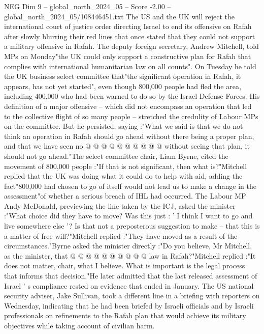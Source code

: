 \begin{textsample}{NEG Dim 9 – global\_north\_2024\_05 – Score -2.00 – global\_north\_2024\_05/108446451.txt}  \label{ex:f9_neg_159}
The US and the UK will reject the international court of justice order directing Israel to end its offensive on Rafah after slowly blurring their red lines that once stated that they could not support a military offensive in Rafah.
The deputy foreign secretary, Andrew Mitchell, told MPs on Monday"the UK could only support a constructive plan for Rafah that complies with international humanitarian law on all counts".
On Tuesday he told the UK business select committee that"the significant operation in Rafah, it appears, has not yet started", even though 800,000 people had fled the area, including 400,000 who had been warned to do so by the Israel Defense Forces.
His definition of a major offensive -- which did not encompass an operation that led to the collective flight of so many people -- stretched the credulity of Labour MPs on the committee.
But he persisted, saying :"What we said is that we do not think an operation in Rafah should go ahead without there being a proper plan, and that we have seen no @ @ @ @ @ @ @ @ @ @ without seeing that plan, it should not go ahead."The select committee chair, Liam Byrne, cited the movement of 800,000 people :"If that is not significant, then what is?"Mitchell replied that the UK was doing what it could do to help with aid, adding the fact"800,000 had chosen to go of itself would not lead us to make a change in the assessment"of whether a serious breach of IHL had occurred.
The Labour MP Andy McDonald, previewing the line taken by the ICJ, asked the minister :"What choice did they have to move?
Was this just : ' I think I want to go and live somewhere else '?
Is that not a preposterous suggestion to make -- that this is a matter of free will?"Mitchell replied :"They have moved as a result of the circumstances."Byrne asked the minister directly :"Do you believe, Mr Mitchell, as the minister, that @ @ @ @ @ @ @ @ @ @ law in Rafah?"Mitchell replied :"It does not matter, chair, what I believe.
What is important is the legal process that informs that decision."He later admitted that the last released assessment of Israel ' s compliance rested on evidence that ended in January.
The US national security adviser, Jake Sullivan, took a different line in a briefing with reporters on Wednesday, indicating that he had been briefed by Israeli officials and by Israeli professionals on refinements to the Rafah plan that would achieve its military objectives while taking account of civilian harm.

\end{textsample}
